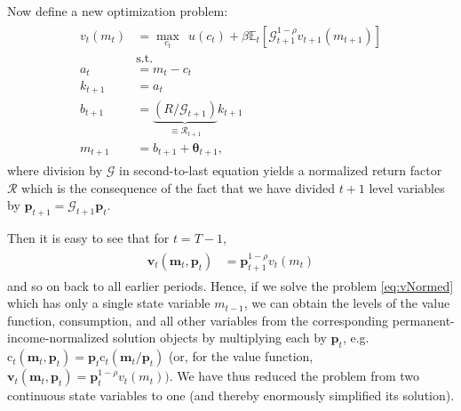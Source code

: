 \documentclass[titlepage, headings=optiontotocandhead]{Resources/texmf-local/tex/latex/econtex}
\begin{document}
Now define a new optimization problem:
  \begin{equation}\begin{gathered}\begin{aligned}
        v_{t}(m_{t}) & = \max_{{c}_{t}} ~~ u(c_{t})+{\beta}{\mathbb{E}}_{t}[ \mathcal{G}_{t+1}^{1-\rho}v_{t+1}(m_{t+1})] \label{eq:vNormed}                   \\
                                         & \text{s.t.}                                                                                 \\
        a_{t}                       & = m_{t}-c_{t}                                                                     \\
        {k}_{t+1}                     & = a_{t}                                                                                \\
        b_{t+1}                     & = \underbrace{\left(R/\mathcal{G}_{t+1}\right)}_{\equiv \mathcal{R}_{t+1}}{k}_{t+1} \\
        m_{t+1}                        & = b_{t+1}+\pmb{\theta}_{t+1},
      \end{aligned}\end{gathered}\end{equation}
where division by $\mathcal{G}$ in second-to-last equation yields a normalized return factor $\mathcal{R}$ which is the consequence of the fact that we have divided $t+1$ level variables by $\mathbf{p}_{t+1}=\mathcal{G}_{t+1}\mathbf{p}_{t}$.

Then it is easy to see that for $t=T-1$, 
\begin{equation*}\begin{gathered}\begin{aligned}
      \mathbf{v}_{t}(\mathbf{m}_{t},\mathbf{p}_{t}) & =  \mathbf{p}_{t+1}^{1-\rho}v_{t}(m_{t})
    \end{aligned}\end{gathered}\end{equation*}
and so on back to all earlier periods.  Hence, if we solve the problem \eqref{eq:vNormed} which has only a single state variable $m_{t-1}$, we can obtain the levels of the value function, consumption, and all other variables from the corresponding permanent-income-normalized solution objects by multiplying each by $\mathbf{p}_{t}$, e.g.\ $\mathrm{c}_{t}(\mathbf{m}_{t},\mathbf{p}_{t})=\mathbf{p}_{t}\mathrm{c}_{t}(\mathbf{m}_{t}/\mathbf{p}_{t})$ (or, for the value function, $\mathbf{v} _{t}(\mathbf{m}_{t},\mathbf{p}_{t}) = \mathbf{p}_{t}^{1-\rho}v_{t}(m_{t}))$.  We have thus reduced the problem from two continuous state variables to one (and thereby enormously simplified its solution).
\end{document}
